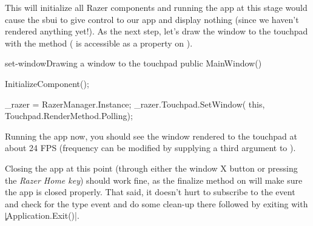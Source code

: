 This will initialize all Razer components and running the app at this stage would cause the \gls{sbui} to give control to our app and display nothing (since we haven't rendered anything yet!). As the next step, let's draw the window to the touchpad with the  method ( is accessible as a property on ).

\begin{csexample}{set-window}{Drawing a window to the touchpad}
public MainWindow()
{
    InitializeComponent();
    
    _razer = RazerManager.Instance;
    _razer.Touchpad.SetWindow(
        this,
        Touchpad.RenderMethod.Polling);
}
\end{csexample}

Running the app now, you should see the window rendered to the touchpad at about 24 FPS (frequency can be modified by supplying a third argument to ).

Closing the app at this point (through either the window X button or pressing the \emph{Razer Home key}) should work fine, as the finalize method on  will make sure the app is closed properly. That said, it doesn't hurt to subscribe to the  event and check for the  type event and do some clean-up there followed by exiting with \c|Application.Exit()|.
